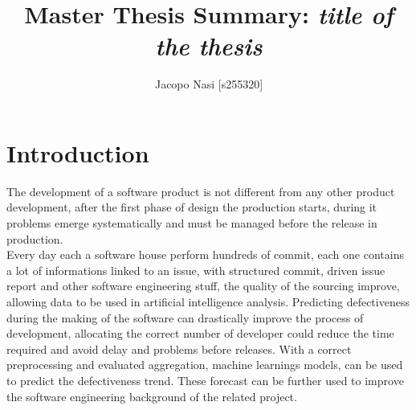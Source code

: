 \documentclass{article}
\begin{document}
\title{Master Thesis Summary: \textit{title of the thesis}}

\author{Jacopo Nasi [s255320]}

\maketitle

\section{Introduction}
The development of a software product is not different from any other product development, after the first phase of design the production starts, during it problems emerge systematically and must be managed before the release in production.\\
Every day each a software house perform hundreds of commit, each one contains a lot of informations linked to an issue, with structured commit, driven issue report and other software engineering stuff, the quality of the sourcing improve, allowing data to be used in artificial intelligence analysis. Predicting defectiveness during the making of the software can drastically improve the process of development, allocating the correct number of developer could reduce the time required and avoid delay and problems before releases.
With a correct preprocessing and evaluated aggregation, machine learnings models, can be used to predict the defectiveness trend. These forecast can be further used to improve the software engineering background of the related project.
\end{document}
